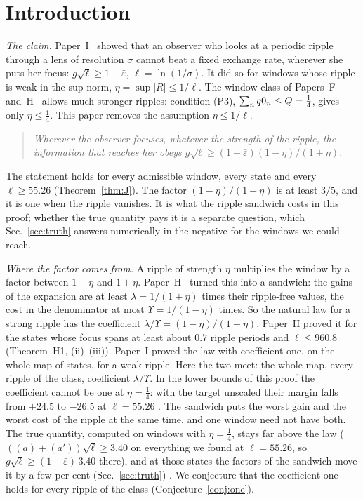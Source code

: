 \section{Introduction}
\label{sec:intro}

\emph{The claim.}
Paper~I~\cite{I} showed that an observer who looks at a periodic ripple through a lens of resolution $\sigma$ cannot beat a fixed exchange rate, wherever she puts her focus:
$g\sqrt\ell\ge1-\bar\varepsilon$, $\ell=\ln(1/\sigma)$.
It did so for windows whose ripple is weak in the sup norm, $\eta=\sup|R|\le1/\ell$.
The window class of Papers~F and~H~\cite{F,H} allows much stronger ripples: condition (P3), $\sum_nq0_n\le\bar Q=\tfrac14$, gives only $\eta\le\tfrac14$.
This paper removes the assumption $\eta\le1/\ell$.
\begin{quote}
\emph{Wherever the observer focuses, whatever the strength of the ripple, the information that reaches her obeys $g\sqrt\ell\ge(1-\bar\varepsilon)(1-\eta)/(1+\eta)$.}
\end{quote}
The statement holds for every admissible window, every state and every $\ell\ge55.26$ (Theorem~\ref{thm:J}).
The factor $(1-\eta)/(1+\eta)$ is at least $3/5$, and it is one when the ripple vanishes.
It is what the ripple sandwich costs in this proof; whether the true quantity pays it is a separate question, which Sec.~\ref{sec:truth} answers numerically in the negative for the windows we could reach.

\emph{Where the factor comes from.}
A ripple of strength $\eta$ multiplies the window by a factor between $1-\eta$ and $1+\eta$.
Paper~H~\cite{H} turned this into a sandwich: the gains of the expansion are at least $\lambda=1/(1+\eta)$ times their ripple-free values, the cost in the denominator at most $\Upsilon=1/(1-\eta)$ times.
So the natural law for a strong ripple has the coefficient $\lambda/\Upsilon=(1-\eta)/(1+\eta)$.
Paper~H proved it for the states whose focus spans at least about $0.7$ ripple periods and $\ell\le960.8$ (Theorem~H1, (ii)--(iii)).
Paper~I proved the law with coefficient one, on the whole map of states, for a weak ripple.
Here the two meet: the whole map, every ripple of the class, coefficient $\lambda/\Upsilon$.
In the lower bounds of this proof the coefficient cannot be one at $\eta=\tfrac14$: with the target unscaled their margin falls from $+24.5$ to $-26.5$ at $\ell=55.26$ \numst.
The sandwich puts the worst gain and the worst cost of the ripple at the same time, and one window need not have both.
The true quantity, computed on windows with $\eta=\tfrac14$, stays far above the law ($((a)+(a'))\sqrt\ell\ge3.40$ on everything we found at $\ell=55.26$, so $g\sqrt\ell\ge(1-\bar\varepsilon)\,3.40$ there), and at those states the factors of the sandwich move it by a few per cent (Sec.~\ref{sec:truth}) \numst.
We conjecture that the coefficient one holds for every ripple of the class (Conjecture~\ref{conj:one}).

